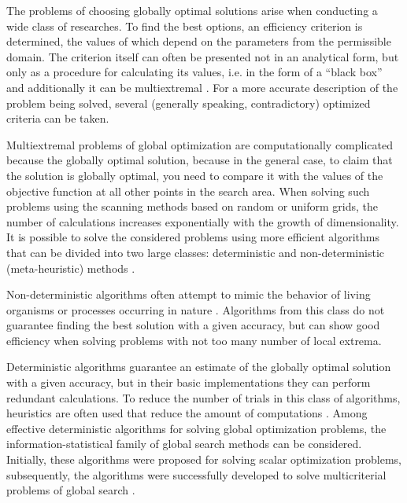 \documentclass[runningheads]{llncs}
\begin{document}


The problems of choosing globally optimal solutions arise when conducting a wide class of researches. To find the best options, an efficiency criterion is determined, the values   of which depend on the parameters from the permissible domain. The criterion itself can often be presented not in an analytical form, but only as a procedure for calculating its values, i.e. in the form of a ``black box'' and additionally it can be multiextremal \cite{Miettinen1999,Ehrgott2005,Pardalos2017,Strongin2000,Sergeyev2013}. For a more accurate description of the problem being solved, several (generally speaking, contradictory) optimized criteria can be taken. 

Multiextremal problems of global optimization are computationally complicated because the globally optimal solution, because in the general case, to claim that the solution is globally optimal, you need to compare it with the values of the objective function at all other points in the search area. When solving such problems using the scanning methods based on random or uniform grids, the number of calculations increases exponentially with the growth of dimensionality. It is possible to solve the considered problems using more efficient algorithms that can be divided into two large classes: deterministic \cite{Miettinen1999,Ehrgott2005,Pardalos2017,Konnov2025,Evtushenko2014} and non-deterministic (meta-heuristic) methods \cite{DPA02,Durillo2010,Mostaghim2007,Nebro2009,RC05,Zitzler2001}. 

Non-deterministic algorithms often attempt to mimic the behavior of living organisms or processes occurring in nature \cite{DPA02,Durillo2010,Mostaghim2007,Nebro2009,RC05,Zitzler2001}. Algorithms from this class do not guarantee finding the best solution with a given accuracy, but can show good efficiency when solving problems with not too many number of local extrema.

Deterministic algorithms guarantee an estimate of the globally optimal solution with a given accuracy, but in their basic implementations they can perform redundant calculations. To reduce the number of trials in this class of algorithms, heuristics are often used that reduce the amount of computations \cite{Konnov2025,AGP_ML}. Among effective deterministic algorithms for solving global optimization problems, the information-statistical family of global search methods \cite{Strongin2000,Sergeyev2013} can be considered. Initially, these algorithms were proposed for solving scalar optimization problems, subsequently, the algorithms were successfully developed to solve multicriterial problems of global search \cite{Konnov2025,MCO_ML_2023}.
\end{document}
